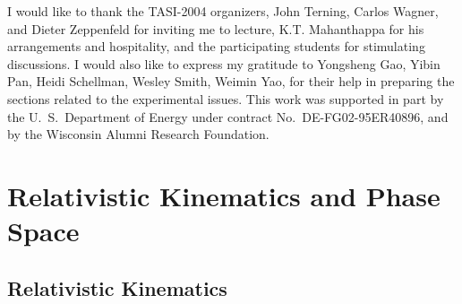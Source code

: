 \documentclass[12pt,prd,aps,floats,preprintnumbers,preprint,superscriptaddress,floatfix,nofootinbib]{revtex4}
\begin{document}
\begin{acknowledgments}
I would like to thank the TASI-2004 organizers, John Terning, Carlos Wagner,
and Dieter Zeppenfeld for inviting me to lecture,  K.T. Mahanthappa for his 
arrangements and hospitality,
and the participating students for stimulating discussions. I would also
like to express my gratitude to Yongsheng Gao, Yibin Pan, Heidi Schellman,
Wesley Smith, Weimin Yao, for their help in preparing the sections related to
the experimental issues. This work was supported in part
by the U.~S.~Department of Energy under contract No.~DE-FG02-95ER40896,
and by the Wisconsin Alumni Research Foundation.
\end{acknowledgments}

\appendix

\section{ Relativistic Kinematics and Phase Space }
\label{app-ps}

\subsection{Relativistic Kinematics}
\end{document}
